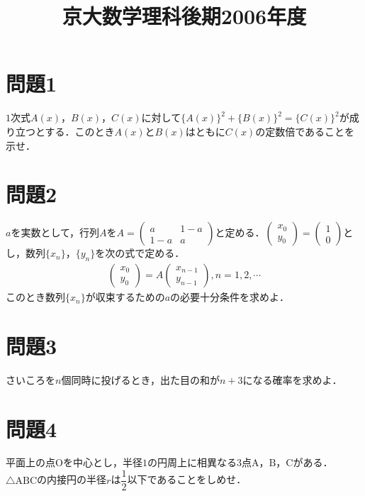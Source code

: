 \documentclass[unicode,12pt, A4j]{ltjsarticle}%
\title{京大数学理科後期2006年度}
\author{}
\date{}
\begin{document}
\maketitle

\section{問題1}
$1$次式$A(x)$，$B(x)$，$C(x)$に対して$\{A(x)\}^2+\{B(x)\}^2=\{C(x)\}^2$が成り立つとする．このとき$A(x)$と$B(x)$はともに$C(x)$の定数倍であることを示せ．



\section{問題2}
$a$を実数として，行列$A$を$A=\begin{pmatrix}a&1-a \\ 1-a&a \end{pmatrix}$と定める．$\begin{pmatrix}x_0 \\ y_0  \end{pmatrix}=\begin{pmatrix} 1 \\ 0  \end{pmatrix}$とし，数列$\{x_n\}$，$\{y_n\}$を次の式で定める．
\begin{align*}
 \begin{pmatrix}
    x_0 \\ y_0  
 \end{pmatrix}
=A
 \begin{pmatrix} 
    x_{n-1} \\ 
    y_{n-1}  
 \end{pmatrix},
n=1,2,\cdots
\end{align*}
このとき数列$\{x_n\}$が収束するための$a$の必要十分条件を求めよ．


\section{問題3}
さいころを$n$個同時に投げるとき，出た目の和が$n+3$になる確率を求めよ．


\section{問題4}
平面上の点$\mathrm{O}$を中心とし，半径$1$の円周上に相異なる$3$点$\mathrm{A}$，$\mathrm{B}$，$\mathrm{C}$がある．$\triangle{\mathrm{ABC}}$の内接円の半径$r$は$\dfrac{1}{2}$以下であることをしめせ．
\end{document}
